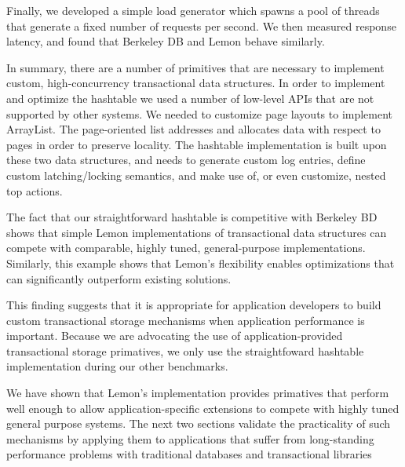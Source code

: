 \documentclass[10pt,letterpaper,twocolumn,english]{article}
\newcommand{\yad}{Lemon\xspace}
\begin{document}

Finally, we developed a simple load generator which spawns a pool of threads that
generate a fixed number of requests per second.  We then measured
response latency, and found that Berkeley DB and \yad behave
similarly.

In summary, there are a number of primitives that are necessary to
implement custom, high-concurrency transactional data structures.  In
order to implement and optimize the hashtable we used a number of
low-level APIs that are not supported by other systems.  We needed to
customize page layouts to implement ArrayList.  The page-oriented list
addresses and allocates data with respect to pages in order to
preserve locality.  The hashtable implementation is built upon these
two data structures, and needs to generate custom log
entries, define custom latching/locking semantics, and make use of, or
even customize, nested top actions.

The fact that our straightforward hashtable is competitive with Berkeley BD
shows that simple \yad implementations of transactional data structures
can compete with comparable, highly tuned, general-purpose
implementations.  Similarly, this example shows that \yad's flexibility 
enables optimizations that can significantly
outperform existing solutions.  

This finding suggests that it is appropriate for
application developers to build custom
transactional storage mechanisms when application performance is
important.  Because we are advocating the use of 
application-provided transactional storage primatives, we only use the 
straightfoward hashtable implementation during our other benchmarks.

We have shown that \yad's implementation provides primatives that perform 
well enough to allow application-specific extensions to compete with highly 
tuned general purpose systems.  The next two sections validate the 
practicality of such mechanisms by applying them to applications 
that suffer from long-standing performance problems with traditional databases
and transactional libraries
\end{document}
